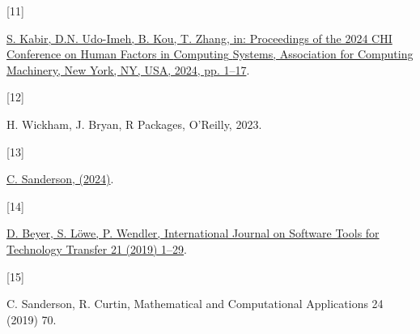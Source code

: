 \documentclass[preprint,12pt, a4paper]{elsarticle}
\newlength{\cslhangindent}
\newlength{\csllabelwidth}
\newenvironment{CSLReferences}[2] %
 {\begin{list}{}{%
  \setlength{\itemindent}{0pt}
  \setlength{\leftmargin}{0pt}
  \setlength{\parsep}{0pt}
  \ifodd #1
   \setlength{\leftmargin}{\cslhangindent}
   \setlength{\itemindent}{-1\cslhangindent}
  \fi
  \setlength{\itemsep}{#2\baselineskip}}}
 {\end{list}}
\newcommand{\CSLLeftMargin}[1]{\parbox[t]{\csllabelwidth}{\strut#1\strut}}
\newcommand{\CSLRightInline}[1]{\parbox[t]{\linewidth - \csllabelwidth}{\strut#1\strut}}
\begin{document}
\begin{CSLReferences}{0}{0}
\CSLLeftMargin{{[}11{]} }%
\CSLRightInline{\href{https://doi.org/10.1145/3613904.3642596}{S. Kabir,
D.N. Udo-Imeh, B. Kou, T. Zhang, in: Proceedings of the 2024 {CHI}
{Conference} on {Human} {Factors} in {Computing} {Systems}, Association
for Computing Machinery, New York, NY, USA, 2024, pp. 1--17}.}

\CSLLeftMargin{{[}12{]} }%
\CSLRightInline{H. Wickham, J. Bryan, R Packages, O'Reilly, 2023.}

\CSLLeftMargin{{[}13{]} }%
\CSLRightInline{\href{https://arma.sourceforge.net/speed.html}{C.
Sanderson, (2024)}.}

\CSLLeftMargin{{[}14{]} }%
\CSLRightInline{\href{https://doi.org/10.1007/s10009-017-0469-y}{D.
Beyer, S. Löwe, P. Wendler, International Journal on Software Tools for
Technology Transfer 21 (2019) 1--29}.}

\CSLLeftMargin{{[}15{]} }%
\CSLRightInline{C. Sanderson, R. Curtin, Mathematical and Computational
Applications 24 (2019) 70.}

\end{CSLReferences}



 

\end{document}
